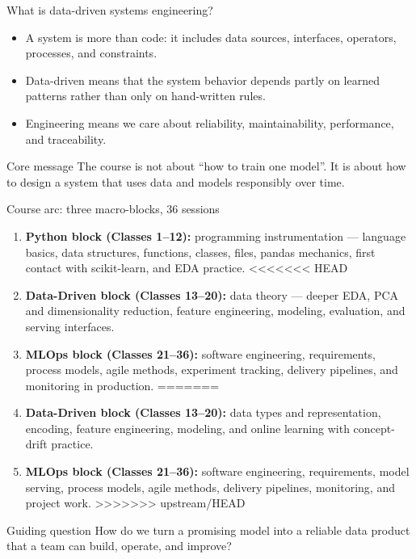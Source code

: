 \begin{frame}{What is data-driven systems engineering?}
\begin{itemize}
\item A system is more than code: it includes data sources, interfaces, operators, processes, and constraints.
\item Data-driven means that the system behavior depends partly on learned patterns rather than only on hand-written rules.
\item Engineering means we care about reliability, maintainability, performance, and traceability.
\end{itemize}
\begin{alertblock}{Core message}
The course is not about ``how to train one model''. It is about how to design a system that uses data and models responsibly over time.
\end{alertblock}
\coursefooter
\end{frame}

\begin{frame}{Course arc: three macro-blocks, 36 sessions}
\begin{enumerate}
\item \textbf{Python block (Classes 1--12):} programming instrumentation --- language basics, data structures, functions, classes, files, pandas mechanics, first contact with scikit-learn, and EDA practice.
<<<<<<< HEAD
\item \textbf{Data-Driven block (Classes 13--20):} data theory --- deeper EDA, PCA and dimensionality reduction, feature engineering, modeling, evaluation, and serving interfaces.
\item \textbf{MLOps block (Classes 21--36):} software engineering, requirements, process models, agile methods, experiment tracking, delivery pipelines, and monitoring in production.
=======
\item \textbf{Data-Driven block (Classes 13--20):} data types and representation, encoding, feature engineering, modeling, and online learning with concept-drift practice.
\item \textbf{MLOps block (Classes 21--36):} software engineering, requirements, model serving, process models, agile methods, delivery pipelines, monitoring, and project work.
>>>>>>> upstream/HEAD
\end{enumerate}
\vspace{0.5em}
\begin{block}{Guiding question}
How do we turn a promising model into a reliable data product that a team can build, operate, and improve?
\end{block}
\coursefooter
\end{frame}


